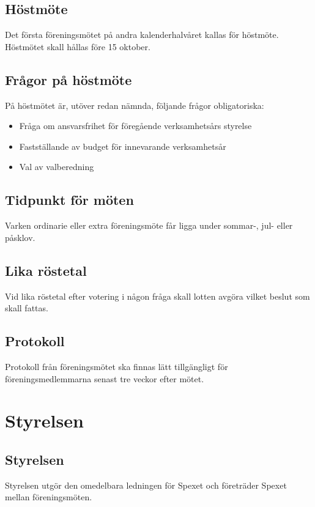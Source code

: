 \documentclass[a4paper]{article}
\begin{document}
\subsection{Höstmöte}
Det första föreningsmötet på andra kalenderhalvåret kallas för höstmöte. Höstmötet skall hållas före 15 oktober.

\subsection{Frågor på höstmöte}
På höstmötet är, utöver redan nämnda, följande frågor obligatoriska:

\begin{itemize}
  \item Fråga om ansvarsfrihet för föregående verksamhetsårs styrelse
  \item Fastställande av budget för innevarande verksamhetsår
  \item Val av valberedning
\end{itemize}

\subsection{Tidpunkt för möten}
Varken ordinarie eller extra föreningsmöte får ligga under sommar-, jul- eller påsklov.

\subsection{Lika röstetal}
Vid lika röstetal efter votering i någon fråga skall lotten avgöra vilket beslut som skall fattas.

\subsection{Protokoll}
Protokoll från föreningsmötet ska finnas lätt tillgängligt för föreningsmedlemmarna senast tre veckor efter mötet.

\section{Styrelsen}
\label{section:styrelsen}

\subsection{Styrelsen}
Styrelsen utgör den omedelbara ledningen för Spexet och företräder Spexet mellan föreningsmöten.
\end{document}
